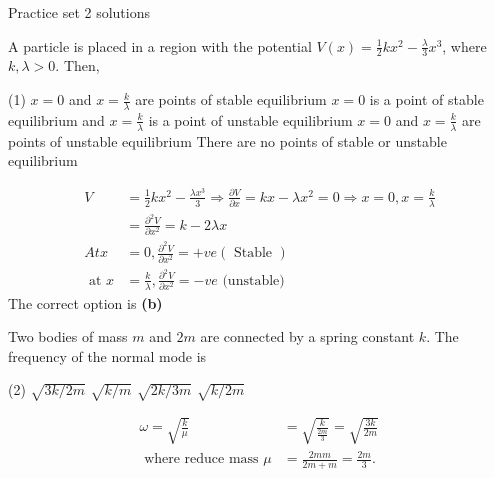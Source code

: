 \newpage
\begin{abox}
Practice set 2 solutions
\end{abox}
\begin{enumerate}
\begin{minipage}{\textwidth}
  \item A particle is placed in a region with the potential $V(x)=\frac{1}{2} k x^{2}-\frac{\lambda}{3} x^{3}$, where $k, \lambda>0$.
  Then,
\end{minipage}
\begin{tasks}(1)
	\task[\textbf{A.}] $x=0$ and $x=\frac{k}{\lambda}$ are points of stable equilibrium
	\task[\textbf{B.}]$x=0$ is a point of stable equilibrium and $x=\frac{k}{\lambda}$ is a point of unstable equilibrium
	\task[\textbf{C.}]$x=0$ and $x=\frac{k}{\lambda}$ are points of unstable equilibrium
	\task[\textbf{D.}]There are no points of stable or unstable equilibrium
\end{tasks}
\begin{answer}
\begin{align*}
V&=\frac{1}{2} k x^{2}-\frac{\lambda x^{3}}{3} \Rightarrow \frac{\partial V}{\partial x}=k x-\lambda x^{2}=0 \Rightarrow x=0, x=\frac{k}{\lambda}\\
&=\frac{\partial^{2} V}{\partial x^{2}}=k-2 \lambda x\\
A t x&=0, \frac{\partial^{2} V}{\partial x^{2}}=+v e(\text { Stable })\\
\text { at } x&=\frac{k}{\lambda}, \frac{\partial^{2} V}{\partial x^{2}}=-v e \text { (unstable) }
\end{align*}
The correct option is \textbf{(b)}	
\end{answer}
\begin{minipage}{\textwidth}
	\item Two bodies of mass $m$ and $2 m$ are connected by a spring constant $k$. The frequency of the normal mode is
\end{minipage}
\begin{tasks}(2)
	\task[\textbf{A.}] $\sqrt{3 k / 2 m}$
	\task[\textbf{B.}]$\sqrt{k / m}$
	\task[\textbf{C.}] $\sqrt{2 k / 3 m}$
	\task[\textbf{D.}]$\sqrt{k / 2 m}$
\end{tasks}
\begin{answer}
	\begin{align*}
\omega=\sqrt{\frac{k}{\mu}}&=\sqrt{\frac{k}{\frac{2 m}{3}}}=\sqrt{\frac{3 k}{2 m}}\\
\text { where reduce mass } \mu&=\frac{2 m m}{2 m+m}=\frac{2 m}{3} \text {. }

\end{align*}
\end{answer}
\end{enumerate}
